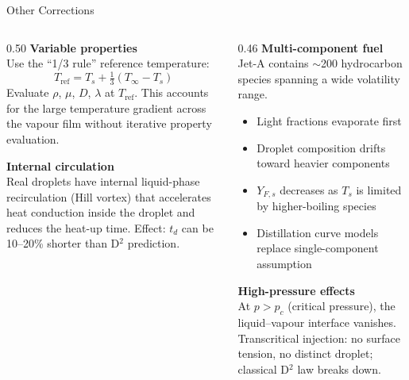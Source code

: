 \documentclass[12pt,aspectratio=169]{beamer}
\newcommand{\Ts}{T_s}
\newcommand{\Tinf}{T_\infty}
\newcommand{\Yfs}{Y_{F,s}}
\newcommand{\td}{t_d}
\begin{document}
\begin{frame}{Other Corrections}

  \begin{columns}[t]
    \begin{column}{0.50\textwidth}
      \textbf{Variable properties}\\[3pt]
      Use the ``1/3 rule'' reference temperature:
      \[
        T_{\text{ref}} = \Ts + \tfrac{1}{3}(\Tinf - \Ts)
      \]
      Evaluate $\rho$, $\mu$, $D$, $\lambda$ at $T_{\text{ref}}$.
      This accounts for the large temperature gradient across the
      vapour film without iterative property evaluation.

      \vspace{6pt}
      \textbf{Internal circulation}\\[3pt]
      Real droplets have internal liquid-phase recirculation
      (Hill vortex) that accelerates heat conduction inside the
      droplet and reduces the heat-up time.
      Effect: $\td$ can be 10--20\% shorter than D$^2$ prediction.
    \end{column}
    \begin{column}{0.46\textwidth}
      \textbf{Multi-component fuel}\\[3pt]
      Jet-A contains $\sim$200 hydrocarbon species spanning
      a wide volatility range.
      \begin{itemize}
        \item Light fractions evaporate first
        \item Droplet composition drifts toward heavier components
        \item $\Yfs$ decreases as $\Ts$ is limited by
              higher-boiling species
        \item Distillation curve models replace
              single-component assumption
      \end{itemize}

      \vspace{4pt}
      \textbf{High-pressure effects}\\[3pt]
      At $p > p_c$ (critical pressure), the liquid--vapour
      interface vanishes.
      Transcritical injection: no surface tension, no distinct
      droplet; classical D$^2$ law breaks down.
    \end{column}
  \end{columns}
\end{frame}
\end{document}
